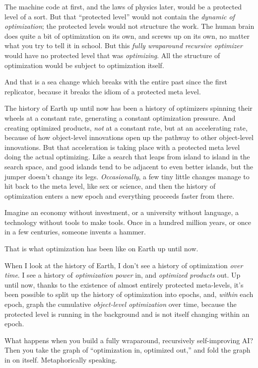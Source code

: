 {
 The machine code at first, and the laws of physics later, would be
a protected level of a sort. But that ``protected
level'' would not contain the \textit{dynamic of
optimization}; the protected levels would not structure the work. The
human brain does quite a bit of optimization on its own, and screws up
on its own, no matter what you try to tell it in school. But this
\textit{fully wraparound recursive optimizer} would have no protected
level that was \textit{optimizing}. All the structure of optimization
would be subject to optimization itself.}

{
 And that is a sea change which breaks with the entire past since
the first replicator, because it breaks the idiom of a protected meta
level.}

{
 The history of Earth up until now has been a history of optimizers
spinning their wheels at a constant rate, generating a constant
optimization pressure. And creating optimized products, \textit{not} at
a constant rate, but at an accelerating rate, because of how
object-level innovations open up the pathway to other object-level
innovations. But that acceleration is taking place with a protected
meta level doing the actual optimizing. Like a search that leaps from
island to island in the search space, and good islands tend to be
adjacent to even better islands, but the jumper doesn't
change its legs. \textit{Occasionally}, a few tiny little changes
manage to hit back to the meta level, like sex or science, and then the
history of optimization enters a new epoch and everything proceeds
faster from there.}

{
 Imagine an economy without investment, or a university without
language, a technology without tools to make tools. Once in a hundred
million years, or once in a few centuries, someone invents a hammer.}

{
 That is what optimization has been like on Earth up until now.}

{
 When I look at the history of Earth, I don't see a
history of optimization \textit{over time}. I see a history of
\textit{optimization power} in, and \textit{optimized products} out. Up
until now, thanks to the existence of almost entirely protected
meta-levels, it's been possible to split up the history
of optimization into epochs, and, \textit{within} each epoch, graph the
cumulative \textit{object-level optimization} over time, because the
protected level is running in the background and is not itself changing
within an epoch.}

{
 What happens when you build a fully wraparound, recursively
self-improving AI? Then you take the graph of
``optimization in, optimized out,''
and fold the graph in on itself. Metaphorically speaking.}

